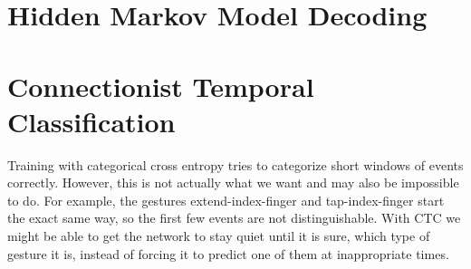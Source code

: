 \section{Hidden Markov Model Decoding}
\label{sec:hmm}

\section{Connectionist Temporal Classification}
\label{sec:ctc}

Training with categorical cross entropy tries to categorize short windows of events correctly.
However, this is not actually what we want and may also be impossible to do.
For example, the gestures extend-index-finger and tap-index-finger start the exact same way, so the first few events are not distinguishable.
With CTC we might be able to get the network to stay quiet until it is sure, which type of gesture it is, instead of forcing it to predict one of them at inappropriate times.
